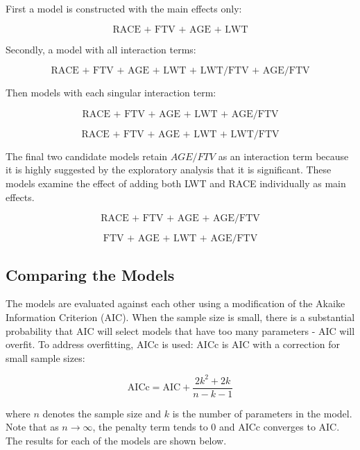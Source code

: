 First a model is constructed with the main effects only:

\begin{equation}
    \text{RACE + FTV + AGE + LWT}
\end{equation}

Secondly, a model with all interaction terms:

\begin{equation}
\label{eq:FullModel}
    \text{RACE + FTV + AGE + LWT + LWT/FTV + AGE/FTV}
\end{equation}

Then models with each singular interaction term:

\begin{equation}
    \text{RACE + FTV + AGE + LWT + AGE/FTV}
\end{equation}

\begin{equation}
    \text{RACE + FTV + AGE + LWT + LWT/FTV}
\end{equation}

The final two candidate models retain $AGE/FTV$ as an interaction term because it is highly suggested by the exploratory analysis that it is significant. These models examine the effect of adding both LWT and RACE individually as main effects.

\begin{equation}
    \text{RACE + FTV + AGE + AGE/FTV}
\end{equation}

\begin{equation} \label{eq:bestmodelone}
    \text{FTV + AGE + LWT + AGE/FTV}
\end{equation}

\subsection{Comparing the Models}
The models are evaluated against each other using a modification of the Akaike Information Criterion (AIC). When the sample size is small, there is a substantial probability that AIC will select models that have too many parameters - AIC will overfit. To address overfitting, AICc is used: AICc is AIC with a correction for small sample sizes: 

\begin{equation}
    \text{AICc} = \text{AIC} + \frac{2k^2 + 2k}{n-k-1}
\end{equation}

where $n$ denotes the sample size and $k$ is the number of parameters in the model. Note that as $n\to\infty$, the penalty term tends to $0$ and AICc converges to AIC. The results for each of the models are shown below.

